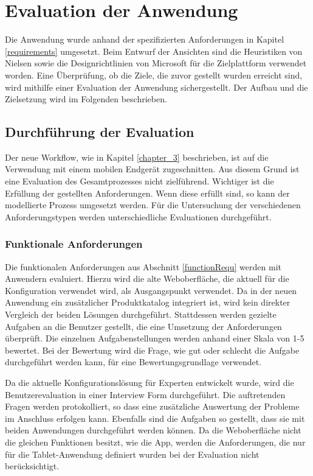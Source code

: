 \chapter{Evaluation der Anwendung}\label{chapter_6}
Die Anwendung wurde anhand der spezifizierten Anforderungen in Kapitel \ref{requirements} umgesetzt. Beim Entwurf der Ansichten sind die Heuristiken von Nielsen \cite{bib:heuristicsNielsen} sowie die Designrichtlinien von Microsoft für die Zielplattform verwendet worden. Eine Überprüfung, ob die Ziele, die zuvor gestellt wurden erreicht sind, wird mithilfe einer Evaluation der Anwendung sichergestellt. Der Aufbau und die Zielsetzung wird im Folgenden beschrieben. 

\section{Durchführung der Evaluation}
Der neue Workflow, wie in Kapitel \ref{chapter_3} beschrieben, ist auf die Verwendung mit einem mobilen Endgerät zugeschnitten. Aus diesem Grund ist eine Evaluation des Gesamtprozesses nicht zielführend. Wichtiger ist die Erfüllung der gestellten Anforderungen. Wenn diese erfüllt sind, so kann der modellierte Prozess umgesetzt werden. Für die Untersuchung der verschiedenen Anforderungstypen werden unterschiedliche Evaluationen durchgeführt.

\subsection{Funktionale Anforderungen}
Die funktionalen Anforderungen aus Abschnitt \ref{functionRequ} werden mit Anwendern evaluiert. Hierzu wird die alte Weboberfläche, die aktuell für die Konfiguration verwendet wird, als Ausgangspunkt verwendet. Da in der neuen Anwendung ein zusätzlicher Produktkatalog integriert ist, wird kein direkter Vergleich der beiden Lösungen durchgeführt. Stattdessen werden gezielte Aufgaben an die Benutzer gestellt, die eine Umsetzung der Anforderungen überprüft. Die einzelnen Aufgabenstellungen werden anhand einer Skala von 1-5 bewertet. Bei der Bewertung wird die Frage, wie gut oder schlecht die Aufgabe durchgeführt werden kann, für eine Bewertungsgrundlage verwendet. 

Da die aktuelle Konfigurationslösung für Experten entwickelt wurde, wird die Benutzerevaluation in einer Interview Form durchgeführt. Die auftretenden Fragen werden protokolliert, so dass eine zusätzliche Auswertung der Probleme im Anschluss erfolgen kann. Ebenfalls sind die Aufgaben so gestellt, dass sie mit beiden Anwendungen durchgeführt werden können. Da die Weboberfläche nicht die gleichen Funktionen besitzt, wie die App, werden die Anforderungen, die nur für die Tablet-Anwendung definiert wurden bei der Evaluation nicht berücksichtigt. 

